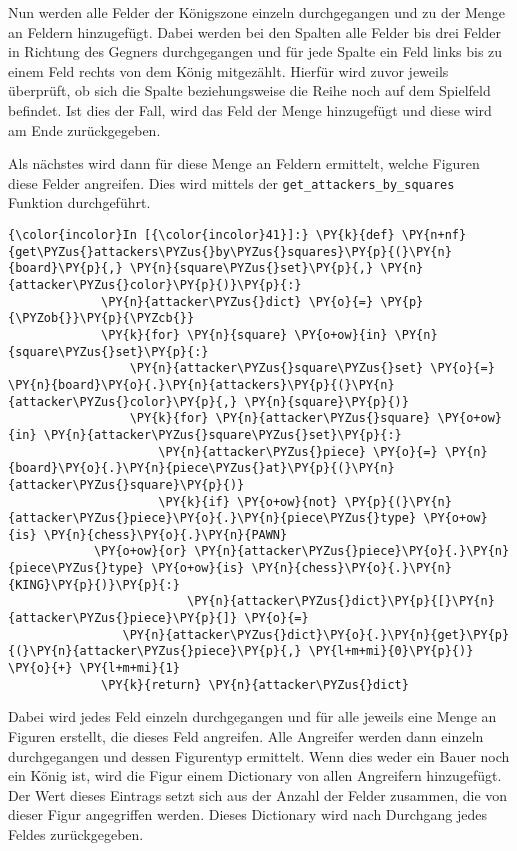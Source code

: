     Nun werden alle Felder der Königszone einzeln durchgegangen und zu der
Menge an Feldern hinzugefügt. Dabei werden bei den Spalten alle Felder
bis drei Felder in Richtung des Gegners durchgegangen und für jede Spalte
ein Feld links bis zu einem Feld rechts von dem König mitgezählt. Hierfür
wird zuvor jeweils überprüft, ob sich die Spalte beziehungsweise die
Reihe noch auf dem Spielfeld befindet. Ist dies der Fall, wird das Feld
der Menge hinzugefügt und diese wird am Ende zurückgegeben.

Als nächstes wird dann für diese Menge an Feldern ermittelt, welche
Figuren diese Felder angreifen. Dies wird mittels der
\texttt{get\_attackers\_by\_squares} Funktion durchgeführt.

        \begin{Verbatim}[commandchars=\\\{\}]
{\color{incolor}In [{\color{incolor}41}]:} \PY{k}{def} \PY{n+nf}{get\PYZus{}attackers\PYZus{}by\PYZus{}squares}\PY{p}{(}\PY{n}{board}\PY{p}{,} \PY{n}{square\PYZus{}set}\PY{p}{,} \PY{n}{attacker\PYZus{}color}\PY{p}{)}\PY{p}{:}
             \PY{n}{attacker\PYZus{}dict} \PY{o}{=} \PY{p}{\PYZob{}}\PY{p}{\PYZcb{}}
             \PY{k}{for} \PY{n}{square} \PY{o+ow}{in} \PY{n}{square\PYZus{}set}\PY{p}{:}
                 \PY{n}{attacker\PYZus{}square\PYZus{}set} \PY{o}{=} \PY{n}{board}\PY{o}{.}\PY{n}{attackers}\PY{p}{(}\PY{n}{attacker\PYZus{}color}\PY{p}{,} \PY{n}{square}\PY{p}{)}
                 \PY{k}{for} \PY{n}{attacker\PYZus{}square} \PY{o+ow}{in} \PY{n}{attacker\PYZus{}square\PYZus{}set}\PY{p}{:}
                     \PY{n}{attacker\PYZus{}piece} \PY{o}{=} \PY{n}{board}\PY{o}{.}\PY{n}{piece\PYZus{}at}\PY{p}{(}\PY{n}{attacker\PYZus{}square}\PY{p}{)}
                     \PY{k}{if} \PY{o+ow}{not} \PY{p}{(}\PY{n}{attacker\PYZus{}piece}\PY{o}{.}\PY{n}{piece\PYZus{}type} \PY{o+ow}{is} \PY{n}{chess}\PY{o}{.}\PY{n}{PAWN} 
			\PY{o+ow}{or} \PY{n}{attacker\PYZus{}piece}\PY{o}{.}\PY{n}{piece\PYZus{}type} \PY{o+ow}{is} \PY{n}{chess}\PY{o}{.}\PY{n}{KING}\PY{p}{)}\PY{p}{:}
                         \PY{n}{attacker\PYZus{}dict}\PY{p}{[}\PY{n}{attacker\PYZus{}piece}\PY{p}{]} \PY{o}{=} 
				\PY{n}{attacker\PYZus{}dict}\PY{o}{.}\PY{n}{get}\PY{p}{(}\PY{n}{attacker\PYZus{}piece}\PY{p}{,} \PY{l+m+mi}{0}\PY{p}{)} \PY{o}{+} \PY{l+m+mi}{1}
             \PY{k}{return} \PY{n}{attacker\PYZus{}dict}
\end{Verbatim}

    Dabei wird jedes Feld einzeln durchgegangen und für alle jeweils eine
Menge an Figuren erstellt, die dieses Feld angreifen. Alle Angreifer
werden dann einzeln durchgegangen und dessen Figurentyp ermittelt. Wenn
dies weder ein Bauer noch ein König ist, wird die Figur einem Dictionary
von allen Angreifern hinzugefügt. Der Wert dieses Eintrags setzt sich
aus der Anzahl der Felder zusammen, die von dieser Figur angegriffen
werden. Dieses Dictionary wird nach Durchgang jedes Feldes
zurückgegeben.

